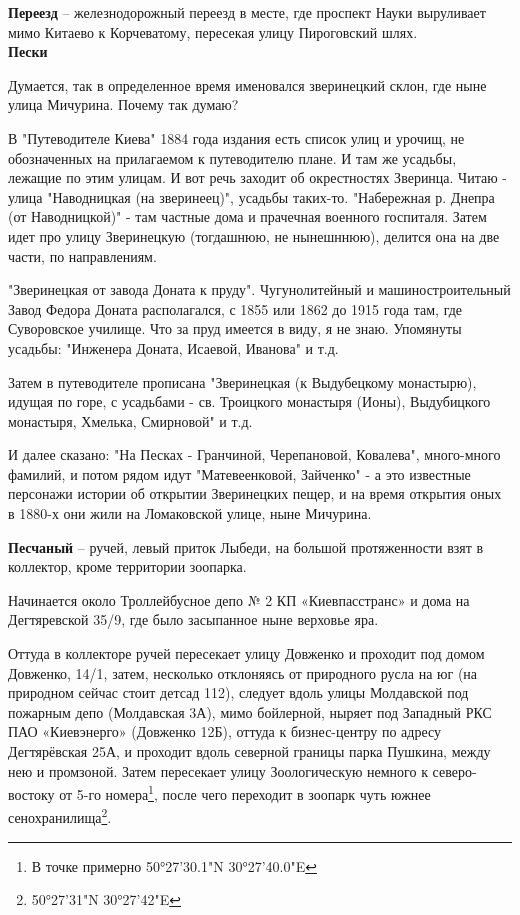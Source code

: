 \textbf{Переезд} – железнодорожный переезд в месте, где проспект Науки выруливает мимо Китаево к Корчеватому, пересекая улицу Пироговский шлях.\\

\textbf{Пески} 

Думается, так в определенное время именовался зверинецкий склон, где ныне улица Мичурина. Почему так думаю?

В "Путеводителе Киева" 1884 года издания есть список улиц и урочищ, не обозначенных на прилагаемом к путеводителю плане. И там же усадьбы, лежащие по этим улицам. И вот речь заходит об окрестностях Зверинца. Читаю - улица "Наводницкая (на зверинеец)", усадьбы таких-то. "Набережная р. Днепра (от Наводницкой)" - там частные дома и прачечная военного госпиталя. Затем идет про улицу Зверинецкую (тогдашнюю, не нынешннюю), делится она на две части, по направлениям.

"Зверинецкая от завода Доната к пруду". Чугунолитейный и машиностроительный Завод Федора Доната располагался, с 1855 или 1862 до 1915 года там, где Суворовское училище. Что за пруд имеется в виду, я не знаю. Упомянуты усадьбы: "Инженера Доната, Исаевой, Иванова" и т.д.

Затем в путеводителе прописана "Зверинецкая (к Выдубецкому монастырю), идущая по горе, с усадьбами - св. Троицкого монастыря (Ионы), Выдубицкого монастыря, Хмелька, Смирновой" и т.д.

И далее сказано: "На Песках - Гранчиной, Черепановой, Ковалева", много-много фамилий, и потом рядом идут "Матевеенковой, Зайченко" - а это известные персонажи истории об открытии Зверинецких пещер, и на время открытия оных в 1880-х они жили на Ломаковской улице, ныне Мичурина.


\textbf{Песчаный} – ручей, левый приток Лыбеди, на большой протяженности взят в коллектор, кроме территории зоопарка.

Начинается около Троллейбусное депо № 2 КП «Киевпасстранс» и дома на Дегтяревской 35/9, где было засыпанное ныне верховье яра. 

Оттуда в коллекторе ручей пересекает улицу Довженко и проходит под домом Довженко, 14/1, затем, несколько отклоняясь от природного русла на юг (на природном сейчас стоит детсад 112), следует вдоль улицы Молдавской под пожарным депо (Молдавская 3А), мимо  бойлерной, ныряет под Западный РКС ПАО «Киевэнерго» (Довженко 12Б), оттуда к бизнес-центру по адресу Дегтярёвская 25А, и проходит вдоль северной границы парка Пушкина, между нею и промзоной. Затем пересекает улицу Зоологическую немного к северо-востоку от 5-го номера\footnote{В точке примерно 50°27'30.1"N 30°27'40.0"E}, после чего переходит в зоопарк чуть южнее сенохранилища\footnote{50°27'31"N 30°27'42"E}.


